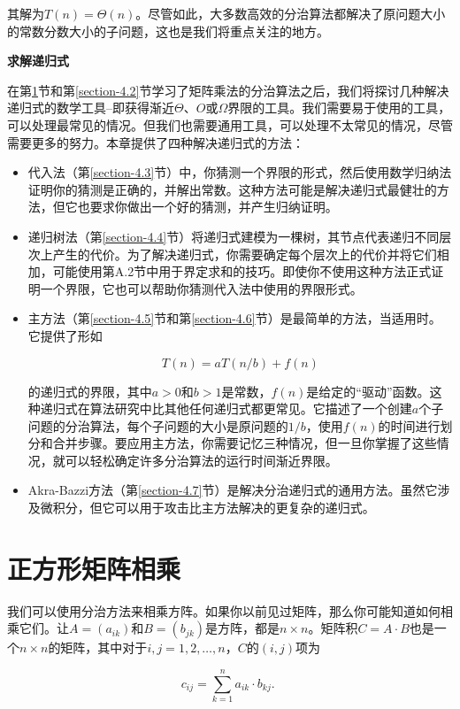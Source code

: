 \documentclass[lang=cn,newtx,10pt,scheme=chinese]{elegantbook}
\begin{document}
其解为$T(n)=\Theta(n)$。尽管如此，大多数高效的分治算法都解决了原问题大小的常数分数大小的子问题，这也是我们将重点关注的地方。

\textbf{求解递归式}

在第\ref{section-4.1}节和第\ref{section-4.2}节学习了矩阵乘法的分治算法之后，我们将探讨几种解决递归式的数学工具--即获得渐近$\Theta$、$O$或$\Omega$界限的工具。我们需要易于使用的工具，可以处理最常见的情况。但我们也需要通用工具，可以处理不太常见的情况，尽管需要更多的努力。本章提供了四种解决递归式的方法：

\begin{itemize}
\item 代入法（第\ref{section-4.3}节）中，你猜测一个界限的形式，然后使用数学归纳法证明你的猜测是正确的，并解出常数。这种方法可能是解决递归式最健壮的方法，但它也要求你做出一个好的猜测，并产生归纳证明。
\item 递归树法（第\ref{section-4.4}节）将递归式建模为一棵树，其节点代表递归不同层次上产生的代价。为了解决递归式，你需要确定每个层次上的代价并将它们相加，可能使用第A.2节中用于界定求和的技巧。即使你不使用这种方法正式证明一个界限，它也可以帮助你猜测代入法中使用的界限形式。
\item 主方法（第\ref{section-4.5}节和第\ref{section-4.6}节）是最简单的方法，当适用时。它提供了形如

$$
T(n)=a T(n / b)+f(n)
$$

的递归式的界限，其中$a>0$和$b>1$是常数，$f(n)$是给定的“驱动”函数。这种递归式在算法研究中比其他任何递归式都更常见。它描述了一个创建$a$个子问题的分治算法，每个子问题的大小是原问题的$1/b$，使用$f(n)$的时间进行划分和合并步骤。要应用主方法，你需要记忆三种情况，但一旦你掌握了这些情况，就可以轻松确定许多分治算法的运行时间渐近界限。
\item Akra-Bazzi方法（第\ref{section-4.7}节）是解决分治递归式的通用方法。虽然它涉及微积分，但它可以用于攻击比主方法解决的更复杂的递归式。
\end{itemize}

\section{正方形矩阵相乘}\label{section-4.1}

我们可以使用分治方法来相乘方阵。如果你以前见过矩阵，那么你可能知道如何相乘它们。让$A=\left(a_{i k}\right)$和$B=\left(b_{j k}\right)$是方阵，都是$n \times n$。矩阵积$C=A \cdot B$也是一个$n \times n$的矩阵，其中对于$i, j=1,2, \ldots, n$，$C$的$(i, j)$项为

\begin{equation}
c_{i j}=\sum_{k=1}^n a_{i k} \cdot b_{k j} \text {. }
\end{equation}
\end{document}

